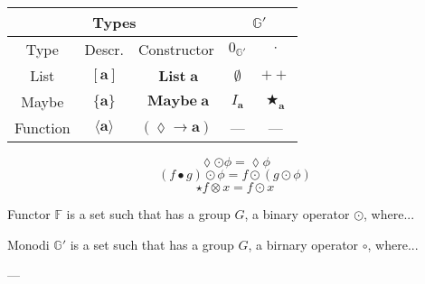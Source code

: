 \documentclass{jsarticle}
\begin{document}
\begin{center}
\begin{tabular}{||c|c|c||c|c||}
\hline
\multicolumn{3}{||c||}{Types}
    &\multicolumn{2}{|c||}{$\mathbb{G}'$}\\
\hline
Type
    &Descr.
    &Constructor
    &$0_\mathbb{G'}$
    &$\cdot$\\
\hline\hline
List
    &$[\mathbf{a}]$
    &$\mathop{\mathbf{List}}\mathbf{a}$
    &$\emptyset$
    &$++$\\
\hline
Maybe
    &$\{\mathbf{a}\}$
    &$\mathop{\mathbf{Maybe}}\mathbf{a}$
    &$I_\mathbf{a}$
    &$\bigstar_\mathbf{a}$\\
\hline
Function
    &$\langle\mathbf{a}\rangle$
    &$(\lozenge\longrightarrow\mathbf{a})$
    &---
    &---\\
\hline
\end{tabular}
\end{center}


$$\lozenge\odot\phi=\lozenge\phi$$
$$(f\bullet g)\odot\phi=f\odot(g\odot\phi)$$
$$\star f\otimes x=f\odot x$$


Functor $\mathbb{F}$ is a set such that has a group $G$, a binary operator $\odot$, where...

Monodi $\mathbb{G}'$ is a set such that has a group $G$, a birnary operator $\circ$, where...

---
\end{document}
